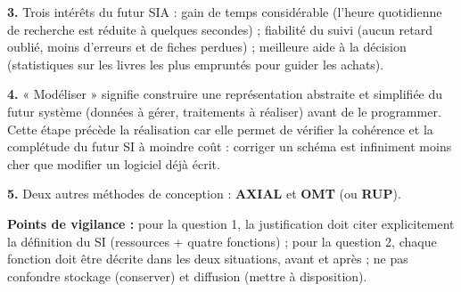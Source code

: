 \documentclass[11pt]{article}
\begin{document}
\begin{corrige}
\textbf{3.} Trois intérêts du futur SIA : gain de temps considérable (l'heure quotidienne de recherche est réduite à quelques secondes) ; fiabilité du suivi (aucun retard oublié, moins d'erreurs et de fiches perdues) ; meilleure aide à la décision (statistiques sur les livres les plus empruntés pour guider les achats).

\textbf{4.} « Modéliser » signifie construire une représentation abstraite et simplifiée du futur système (données à gérer, traitements à réaliser) avant de le programmer. Cette étape précède la réalisation car elle permet de vérifier la cohérence et la complétude du futur SI à moindre coût : corriger un schéma est infiniment moins cher que modifier un logiciel déjà écrit.

\textbf{5.} Deux autres méthodes de conception : \textbf{AXIAL} et \textbf{OMT} (ou \textbf{RUP}).

\textbf{Points de vigilance :} pour la question 1, la justification doit citer explicitement la définition du SI (ressources + quatre fonctions) ; pour la question 2, chaque fonction doit être décrite dans les deux situations, avant et après ; ne pas confondre stockage (conserver) et diffusion (mettre à disposition).
\end{corrige}
\end{document}
